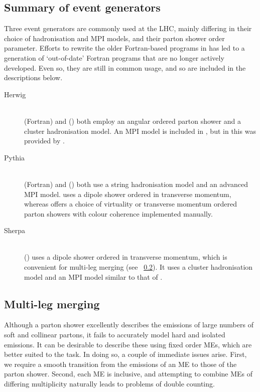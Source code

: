 \subsection{Summary of event generators}
\label{sec:mc:generators}

Three event generators are commonly used at the LHC, mainly differing in their 
choice of hadronisation and MPI models, and their parton shower order parameter. 
Efforts to rewrite the older Fortran-based programs in \cpp has led to a generation of 
`out-of-date' Fortran programs that are no longer actively developed. Even so, they are 
still in common usage, and so are included in the descriptions below.

\begin{description}
\item[Herwig] \hfill \\
	\fherwig (Fortran) \cite{fHerwig} and \herwigpp (\cpp) \cite{Herwig++} both employ an 
	angular ordered parton shower and a cluster hadronisation model. An MPI model is 
	included in \herwigpp, but in \fherwig this was provided by \jimmy \cite{Jimmy}.
\item[Pythia] \hfill \\
	 (Fortran) \cite{Pythia6} and  (\cpp) \cite{Pythia8} both use a 
	string hadronisation model and an advanced MPI model.  uses a dipole 
	shower ordered in transverse momentum, whereas  offers a choice of 
	virtuality or transverse momentum ordered parton showers with colour coherence 
	implemented manually.
\item[Sherpa] \hfill \\
	\sherpa (\cpp) \cite{Sherpa} uses a dipole shower ordered in transverse momentum, 
	which is convenient for multi-leg merging (see \Section~\ref{sec:mc:merging}). It 
	uses a cluster hadronisation model and an MPI model similar to that of .
\end{description}



\subsection{Multi-leg merging}
\label{sec:mc:merging}

Although a parton shower excellently describes the emissions of large numbers of soft and 
collinear partons, it fails to accurately model hard and isolated emissions. It can be 
desirable to describe these using fixed order MEs, which are better suited to the 
task. In doing so, a couple of immediate issues arise. First, we require a smooth 
transition from the emissions of an ME to those of the parton shower. Second, each 
ME is inclusive, and attempting to combine MEs of differing multiplicity 
naturally leads to problems of double counting.

